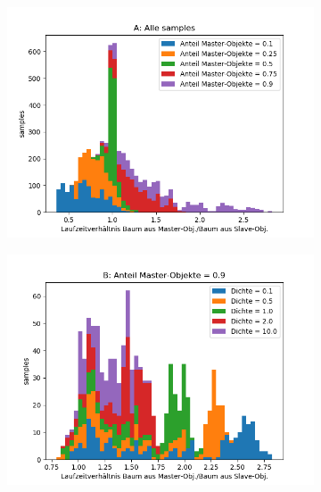 \begin{figure}
	\begin{subfigure}[t]{0.50\textwidth}
		\centering
		\includegraphics[width=1\textwidth]{./res/boxsortChoice-uniform-A.png}
		
		\label{fig:boxsortChoice-uniform-A}
	\end{subfigure}
\hfill
	\begin{subfigure}[t]{0.50\textwidth}
		\centering
		\includegraphics[width=1\textwidth]{./res/boxsortChoice-uniform-B.png}


\end{subfigure}
\end{figure}
